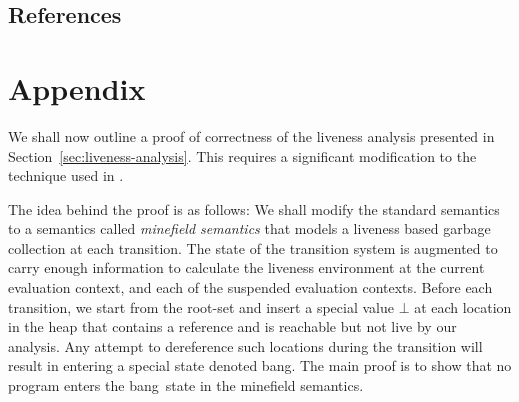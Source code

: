 \documentclass[9pt]{sigplanconf}
\newcommand{\cblue}[1]{{\color{blue}{#1}}}
\newcommand{\bang}{\mbox{\sc bang}}
\begin{document}


\subsection{References}
{}


\pagebreak

\pagebreak
\section{Appendix}

We shall now  outline a proof of correctness  of the liveness analysis
presented  in  Section~\ref{sec:liveness-analysis}.   This requires  a
significant modification  to the technique  used in \cite{asati14lgc}.
\cblue{Good points to  make in the main text, right  in the small step
  semantics  section: Note  that the  state of  the  transition system
  consists of the current evaluation context, given by $\rho$ and $e$,
  and  the suspended evaluation  contexts recorded  in the  stack $S$.
  The heap $H$  is common to all contexts.}

The idea behind the proof is  as follows: We shall modify the standard
semantics to a semantics  called {\em minefield semantics} that models
a liveness based garbage collection  at each transition.  The state of
the  transition system  is augmented  to carry  enough  information to
calculate the liveness environment  at the current evaluation context,
and  each   of  the   suspended  evaluation  contexts.    Before  each
transition,  we start  from the  root-set and  insert a  special value
$\bot$ at each  location in the heap that contains  a reference and is
reachable but  not live by  our analysis.  Any attempt  to dereference
such locations during the transition will result in entering a special
state denoted \bang.  The main proof is to show that no program enters
the \bang\ state in the minefield semantics.
 
\end{document}
